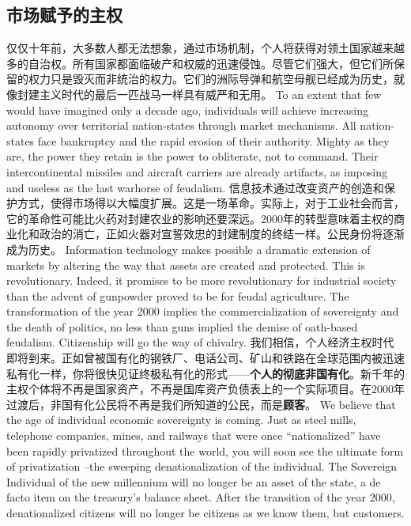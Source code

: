 \subsection{市场赋予的主权}
\begin{paracol}{2}[]
仅仅十年前，大多数人都无法想象，通过市场机制，个人将获得对领土国家越来越多的自治权。所有国家都面临破产和权威的迅速侵蚀。尽管它们强大，但它们所保留的权力只是毁灭而非统治的权力。它们的洲际导弹和航空母舰已经成为历史，就像封建主义时代的最后一匹战马一样具有威严和无用。
\switchcolumn
To an extent that few would have imagined only a decade ago, individuals will achieve increasing autonomy over territorial nation-states through market mechanisms. All nation-states face bankruptcy and the rapid erosion of their authority. Mighty as they are, the power they retain is the power to obliterate, not to command. Their intercontinental missiles and aircraft carriers are already artifacts, as imposing and useless as the last warhorse of feudalism.
\switchcolumn*
信息技术通过改变资产的创造和保护方式，使得市场得以大幅度扩展。这是一场革命。实际上，对于工业社会而言，它的革命性可能比火药对封建农业的影响还要深远。2000年的转型意味着主权的商业化和政治的消亡，正如火器对宣誓效忠的封建制度的终结一样。公民身份将逐渐成为历史。
\switchcolumn
Information technology makes possible a dramatic extension of markets by altering the way that assets are created and protected. This is revolutionary. Indeed, it promises to be more revolutionary for industrial society than the advent of gunpowder proved to be for feudal agriculture. The transformation of the year 2000 implies the commercialization of sovereignty and the death of politics, no less than guns implied the demise of oath-based feudalism. Citizenship will go the way of chivalry.
\switchcolumn*
我们相信，个人经济主权时代即将到来。正如曾被国有化的钢铁厂、电话公司、矿山和铁路在全球范围内被迅速私有化一样，你将很快见证终极私有化的形式——\textbf{个人的彻底非国有化}。新千年的主权个体将不再是国家资产，不再是国库资产负债表上的一个实际项目。在2000年过渡后，非国有化公民将不再是我们所知道的公民，而是\textbf{顾客}。
\switchcolumn
We believe that the age of individual economic sovereignty is coming. Just as steel mills, telephone companies, mines, and railways that were once ``nationalized'' have been rapidly privatized throughout the world, you will soon see the ultimate form of privatization --the sweeping denationalization of the individual. The Sovereign Individual of the new millennium will no longer be an asset of the state, a de facto item on the treasury's balance sheet. After the transition of the year 2000, denationalized citizens will no longer be citizens as we know them, but customers.
\end{paracol}

